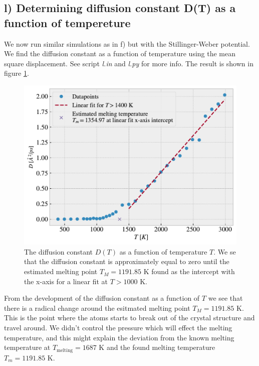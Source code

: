 \documentclass[reprint, amsmath, amssymb, aps]{revtex4-2}
\begin{document}
\subsection*{l) Determining diffusion constant D(T) as a function of tempereture}
We now run similar simulations as in f) but with the Stillinger-Weber potential. We find the diffusion constant as a function of temperature using the mean square displacement. See script \textit{l.in} and \textit{l.py} for more info. The result is shown in figure \ref{fig:D(T)}.
\begin{figure}[H]
  \includegraphics[width=\linewidth]{figures/D(T).pdf}
  \caption{The diffusion constant $D(T)$ as a function of temperature $T$. We se that the diffusion constant is approximately equal to zero until the estimated melting point $T_M = 1191.85$ K found as the intercept with the x-axis for a linear fit at $T > 1000$ K.}
  \label{fig:D(T)}
\end{figure}
From the development of the diffusion constant as a function of $T$ we see that there is a radical change around the esitmated melting point $T_M = 1191.85$ K. This is the point where the atoms starts to break out of the crystal structure and travel around. We didn't control the pressure which will effect the melting temperature, and this might explain the deviation from the known melting temperature at $T_{\text{melting}} = 1687 $ K and the found melting temperature $T_m = 1191.85$ K.
%
%
\end{document}

